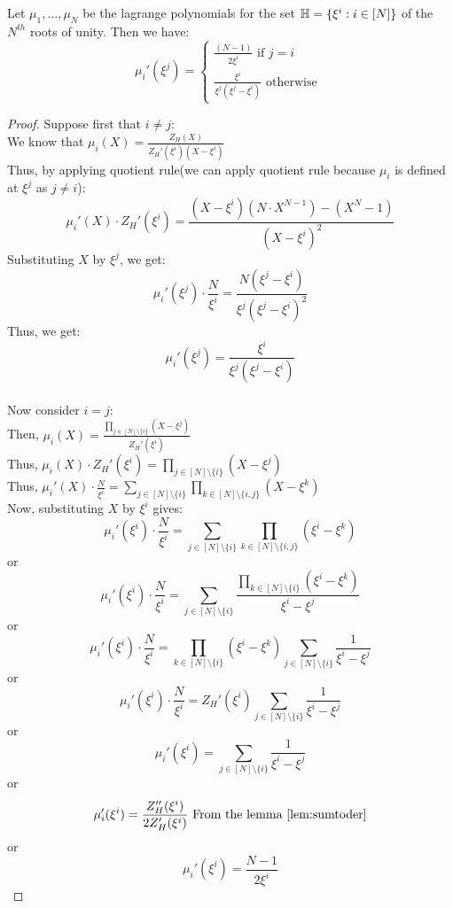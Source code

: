 \begin{lemma}\label{lem:lamda-deriv}
Let $\mu_1,\ldots,\mu_N$ be the lagrange polynomials for the set $\mathbb{H}=\{\xi^i:i\in [N]\}$
of the $N^{th}$ roots of unity. Then we have:
\begin{equation*}
    \mu_i'(\xi^j) = \begin{cases}
                        \frac{(N-1)}{2\xi^{i}}  \text{ if } j=i\\
                        \frac{\xi^i}{\xi^j(\xi^j-\xi^i)} \text{ otherwise }
    \end{cases}
\end{equation*}
\end{lemma}

\begin{proof}
    Suppose first that $i \neq j$:\\
    We know that $\mu_i(X)= \frac{Z_H(X)}{Z_H'(\xi^i)(X-\xi^i)}$\\
    Thus, by applying quotient rule(we can apply quotient rule because $\mu_i$ is defined at $\xi^j$ as $j\neq i$):
    $$\mu_i'(X) \cdot Z_H'(\xi^i)= \frac{(X-\xi^i)(N\cdot X^{N-1})-(X^N-1)}{(X-\xi^i)^2}$$
    Substituting $X$ by $\xi^j$, we get:
    $$\mu_i'(\xi^j) \cdot \frac{N}{\xi^i}= \frac{N(\xi^j-\xi^i)}{\xi^j (\xi^j-\xi^i)^2}$$
    Thus, we get:
    $$\mu_i'(\xi^j)=\frac{\xi^i}{\xi^j(\xi^j-\xi^i)}$$\\
    Now consider $i=j$:\\
    Then, $\mu_i(X)=\frac{\prod_{j \in [N] \setminus \{i\}}(X-\xi^j)}{Z_H'(\xi^i)}$\\
    Thus,  $\mu_i(X)\cdot Z_H'(\xi^i)=\prod_{j \in [N] \setminus \{i\}}(X-\xi^j)$\\
    Thus, $\mu_i'(X) \cdot \frac{N}{\xi^i}=\sum_{j \in [N] \setminus \{i\}}\prod_{k \in [N]\setminus\{i,j\}}(X-\xi^k)$\\
    Now, substituting $X$ by $\xi^i$ gives:
    $$\mu_i'(\xi^i) \cdot \frac{N}{\xi^i}=\sum_{j \in [N] \setminus \{i\}}\prod_{k \in [N]\setminus\{i,j\}}(\xi^i-\xi^k)$$
    or
    $$\mu_i'(\xi^i) \cdot \frac{N}{\xi^i}=\sum_{j \in [N] \setminus \{i\}}\frac{\prod_{k \in [N]\setminus\{i\}}(\xi^i-\xi^k)}{\xi^i-\xi^j}$$
    or$$\mu_i'(\xi^i) \cdot \frac{N}{\xi^i}= \prod_{k \in [N]\setminus\{i\}}(\xi^i-\xi^k)\sum_{j\in [N]\setminus \{i\}}\frac{1}{\xi^i-\xi^j}$$
    or $$\mu_i'(\xi^i) \cdot \frac{N}{\xi^i}=Z_H'(\xi^i)\sum_{j\in [N]\setminus \{i\}}\frac{1}{\xi^i-\xi^j}$$
    or $$\mu_i'(\xi^i)=\sum_{j\in [N]\setminus \{i\}}\frac{1}{\xi^i-\xi^j}$$
    or $$\mu_i'(\xi^i)=\frac{Z_H''(\xi^i)}{2 Z_H'(\xi^i)} \text{ From the lemma \ref{lem:sumtoder}}$$
    or $$ \mu_i'(\xi^i)=\frac{N-1}{2\xi^i}$$

\end{proof}

